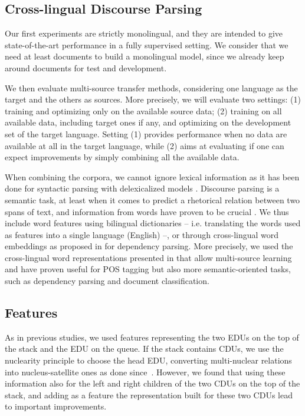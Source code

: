 \documentclass[11pt]{article}
\begin{document}
\subsection{Cross-lingual Discourse Parsing}
\label{subsec:cross}

Our first experiments are strictly monolingual, and they are intended to give state-of-the-art performance in a fully supervised setting.
We consider that we need at least  documents to build a monolingual model, since we already keep around  documents for test and development.

We then evaluate multi-source transfer methods, considering one language as the target and the others as sources.
More precisely, we will evaluate two settings: (1) training and optimizing only on the available source data; (2) training on all available data, including target ones if any, and optimizing on the development set of the target language. Setting (1) provides performance when no data are available at all in the target language, while (2) aims at evaluating if one can expect improvements by simply combining all the available data.

When combining the corpora, we cannot ignore lexical information as it has been done for syntactic parsing with delexicalized models \cite{mcdonald:multi:2011}.
Discourse parsing is a semantic task, at least when it comes to predict a rhetorical relation between two spans of text, and information from words have proven to be crucial \cite{rutherford:discovering:2014,braud:comparing:2015}.
We thus include word features using bilingual dictionaries -- i.e. translating the words used as features into a single language (English) --, or through cross-lingual word embeddings as proposed in \cite{guo:cross:2015} for dependency parsing. 
More precisely, we used the cross-lingual word representations presented in \cite{levy:strong:2017} that allow multi-source learning and have proven useful for POS tagging but also more semantic-oriented tasks, such as dependency parsing and document classification.

\subsection{Features}
\label{sec:features}

As in previous studies, we used features representing the two EDUs on the top of the stack and the EDU on the queue. If the stack contains CDUs, we use the nuclearity principle to choose the head EDU, converting multi-nuclear relations into nucleus-satellite ones as done since~\cite{sagae:analysis:2009}. 
However, we found that using these information also for the left and right children of the two CDUs on the top of the stack, and adding as a feature the representation built for these two CDUs lead to important improvements.
\end{document}
